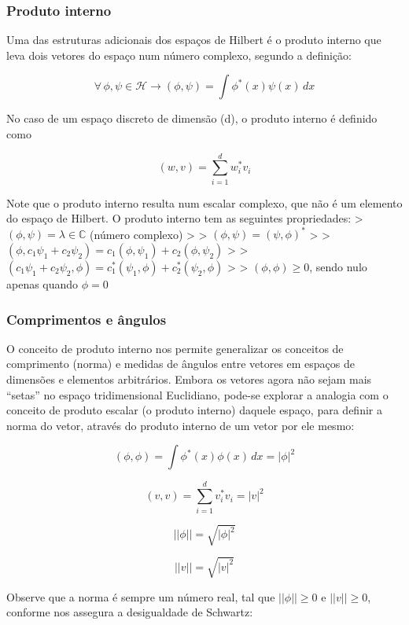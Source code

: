 \documentclass[11pt]{article}
\begin{document}
\hypertarget{produto-interno}{%
\subsubsection{Produto interno}\label{produto-interno}}

Uma das estruturas adicionais dos espaços de Hilbert é o produto interno
que leva dois vetores do espaço num número complexo, segundo a
definição:

\[\forall\, \phi, \psi \in \mathcal{H} \rightarrow (\phi,\psi) = \int \phi^*(x)\psi(x)\,dx\]

No caso de um espaço discreto de dimensão (d), o produto interno é
definido como

\[(w,v)=\sum_{i=1}^{d} w_i^* v_i\]

Note que o produto interno resulta num escalar complexo, que não é um
elemento do espaço de Hilbert. O produto interno tem as seguintes
propriedades: \textgreater{} \((\phi,\psi) = \lambda \in \mathbb{C}\)
(número complexo) \textgreater{} \textgreater{}
\((\phi,\psi) = (\psi,\phi)^*\) \textgreater{} \textgreater{}
\((\phi, c_1 \psi_1 + c_2 \psi_2 ) = c_1(\phi, \psi_1) + c_2(\phi,\psi_2 )\)
\textgreater{} \textgreater{}
\((c_1 \psi_1 + c_2 \psi_2, \phi ) = c_1^* (\psi_1, \phi) + c_2^*(\psi_2, \phi)\)
\textgreater{} \textgreater{} \((\phi,\phi) \ge 0\), sendo nulo apenas
quando \(\phi=0\)

\hypertarget{comprimentos-e-uxe2ngulos}{%
\subsubsection{Comprimentos e ângulos}\label{comprimentos-e-uxe2ngulos}}

O conceito de produto interno nos permite generalizar os conceitos de
comprimento (norma) e medidas de ângulos entre vetores em espaços de
dimensões e elementos arbitrários. Embora os vetores agora não sejam
mais ``setas'' no espaço tridimensional Euclidiano, pode-se explorar a
analogia com o conceito de produto escalar (o produto interno) daquele
espaço, para definir a norma do vetor, através do produto interno de um
vetor por ele mesmo:

\[(\phi,\phi) = \int \phi^*(x)\phi(x)\,dx = |\phi|^2\]

\[(v,v) = \sum_{i=1}^{d} v^*_i v_i = |v|^2\]

\[||\phi|| = \sqrt{|\phi|^2}\]

\[||v|| = \sqrt{|v|^2}\]

Observe que a norma é sempre um número real, tal que \(||\phi|| \ge 0\)
e \(||v|| \ge 0\), conforme nos assegura a desigualdade de Schwartz:
\end{document}
